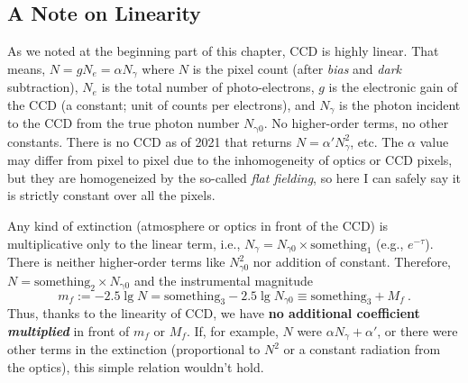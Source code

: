 \subsection{A Note on Linearity} \label{ss: linearity note}
As we noted at the beginning part of this chapter, CCD is highly linear. That means, $ N = g N_e = \alpha N_\gamma $ where $ N $ is the pixel count (after \emph{bias} and \emph{dark} subtraction), $ N_e $ is the total number of photo-electrons, $ g $ is the electronic gain of the CCD (a constant; unit of counts per electrons), and $ N_\gamma $ is the photon incident to the CCD from the true photon number $ N_\mathrm{\gamma 0} $. No higher-order terms, no other constants. There is no CCD as of 2021 that returns $ N = \alpha' N_\gamma^2 $, etc. The $ \alpha $ value may differ from pixel to pixel due to the inhomogeneity of optics or CCD pixels, but they are homogeneized by the so-called \emph{flat fielding}, so here I can safely say it is strictly constant over all the pixels. 

Any kind of extinction (atmosphere or optics in front of the CCD) is multiplicative only to the linear term, i.e., $ N_\gamma = N_{\gamma 0} \times \mathrm{something_1} $ (e.g., $ e^{-\tau} $). There is neither higher-order terms like $ N_{\gamma 0}^2 $ nor addition of constant. Therefore, $ N = \mathrm{something_2} \times N_\mathrm{\gamma 0} $ and the instrumental magnitude
\begin{equation}
  m_f 
    := -2.5 \lg N 
    = \mathrm{something_3} - 2.5 \lg N_{\gamma 0}
    \equiv \mathrm{something_3} + M_f ~.
\end{equation} 
Thus, thanks to the linearity of CCD, we have \textbf{no additional coefficient \emph{multiplied}} in front of $ m_f $ or $ M_f $. If, for example, $ N $ were $ \alpha N_\gamma + \alpha' $, or there were other terms in the extinction (proportional to $ N^2 $ or a constant radiation from the optics), this simple relation wouldn't hold.


